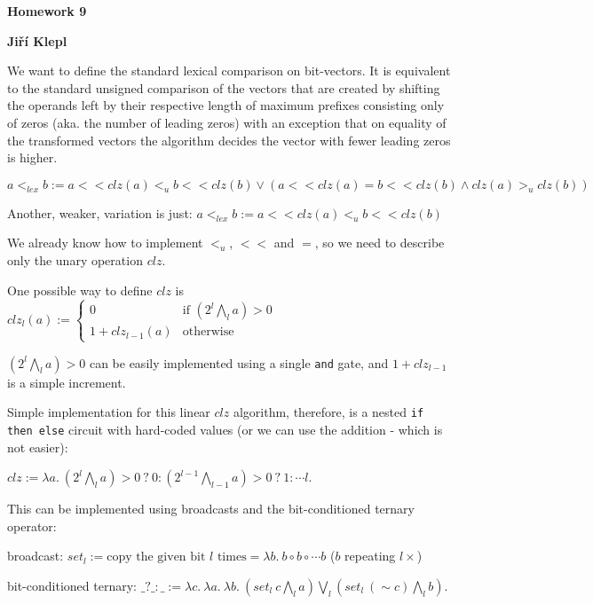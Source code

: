 \documentclass[a4paper,12pt]{article} %
\begin{document}
\begin{center}
    {\Large \bf Homework 9}
    \vspace{2mm}

    {\bf Jiří Klepl}

\end{center}

\vspace{0.4cm}

We want to define the standard lexical comparison on bit-vectors. It is equivalent to the standard unsigned comparison of the vectors that are created by shifting the operands left by their respective length of maximum prefixes consisting only of zeros (aka. the number of leading zeros) with an exception that on equality of the transformed vectors the algorithm decides the vector with fewer leading zeros is higher.

$a <_{lex} b := a << clz(a) <_u  b << clz(b) \vee (a << clz(a) = b << clz(b) \wedge clz(a) >_u clz(b))$

Another, weaker, variation is just: $a <_{lex} b := a << clz(a) <_u  b << clz(b)$

We already know how to implement $<_u$, $<<$ and $=$, so we need to describe only the unary operation $clz$.

One possible way to define $clz$ is $clz_l(a) := \begin{cases} 0 & \text{if }(2^l \bigwedge_l a) > 0 \\ 1 + clz_{l - 1}(a) & \text{otherwise}\end{cases}$

$(2^l \bigwedge_l a) > 0$ can be easily implemented using a single \texttt{and} gate, and $1 + clz_{l - 1}$ is a simple increment.

Simple implementation for this linear $clz$ algorithm, therefore, is a nested \texttt{if then else} circuit with hard-coded values (or we can use the addition - which is not easier):

$clz := \lambda a .\ (2^l \bigwedge_l a) > 0\ ?\ 0 : (2^{l-1} \bigwedge_{l-1} a) > 0\ ?\ 1 : \cdots l$.

This can be implemented using broadcasts and the bit-conditioned ternary operator:

broadcast: $set_l := \text{copy the given bit } l \text{ times} = \lambda b.\ b \circ b \circ \cdots b$ ($b$ repeating $l\times$)

bit-conditioned ternary: $\_ ? \_ : \_ := \lambda c.\ \lambda a.\ \lambda b.\ (set_l\ c \bigwedge_l a) \bigvee_l (set_l\ (\sim c) \bigwedge_l b)$.
\end{document}
